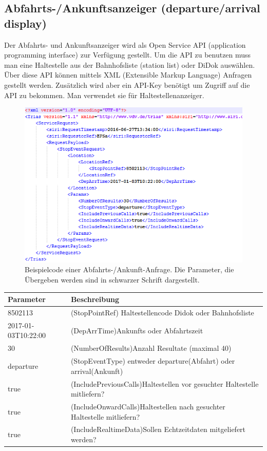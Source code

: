 \subsection{Abfahrts-/Ankunftsanzeiger (departure/arrival display)}%
\label{sec:Abfahrts-/Ankunftsanzeiger}
Der Abfahrts- und Ankunftsanzeiger wird als Open Service API (application programming interface) zur Verfügung gestellt. Um die API zu benutzen muss man eine Haltestelle aus der Bahnhofsliste (station list) oder DiDok auswählen. Über diese API können mittels XML (Extensible Markup Language) Anfragen gestellt werden. Zusätzlich wird aber ein API-Key benötigt um Zugriff auf die API zu bekommen. Man verwendet sie für Haltestellenanzeiger. \cite{abfahrts-ankunftsanzeige}

\begin{figure}[]
	\centering
	\includegraphics[width=12cm]{img/bspAbfrageAnkunftAbfahrt.png}
	\caption{Beispielcode einer Abfahrts-/Ankunft-Anfrage. Die Parameter, die Übergeben werden sind in schwarzer Schrift dargestellt.\cite{abfahrts-ankunftsanzeige}}
	\label{fig:Beispiel Anfrage Abfahrts-/Ankunftsanzeiger}
\end{figure}
\begin{tabular}{|l|l|}  \hline
	Parameter & Beschreibung \\ \hline
	8502113 & (StopPointRef) Haltestellencode Didok oder Bahnhofsliste   \\ \hline
	2017-01-03T10:22:00 & (DepArrTime)Ankunfts oder Abfahrtszeit \\ \hline
	30 & (NumberOfResults)Anzahl Resultate (maximal 40) \\ \hline
	departure & (StopEventType) entweder departure(Abfahrt) oder arrival(Ankunft) \\ \hline
	true & (IncludePreviousCalls)Haltestellen vor gesuchter Haltestelle mitliefern? \\ \hline	
	true & (IncludeOnwardCalls)Haltestellen nach gesuchter Haltestelle mitliefern? \\ \hline
	true & (IncludeRealtimeData)Sollen Echtzeitdaten mitgeliefert werden? \\ \hline
\end{tabular}

